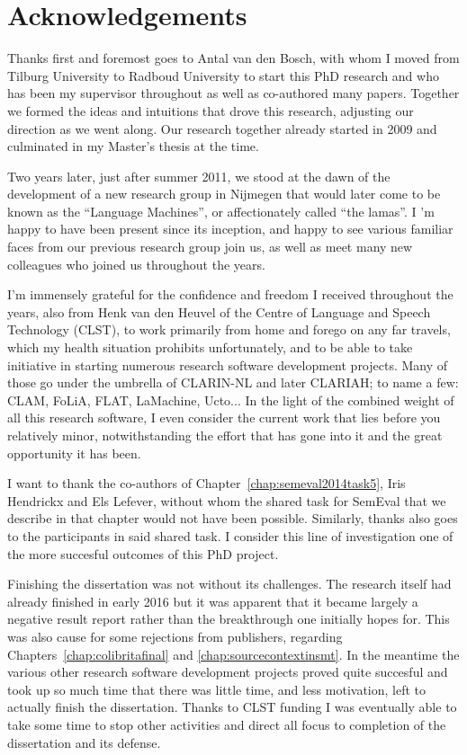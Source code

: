 \chapter*{Acknowledgements}

Thanks first and foremost goes to Antal van den Bosch, with whom I moved from
Tilburg University to Radboud University to start this PhD research and who has
been my supervisor throughout as well as co-authored many papers. Together we formed
the ideas and intuitions that drove this research, adjusting our direction as
we went along. Our research together already started in 2009
and culminated in my Master's thesis at the time.

Two years later, just after summer 2011, we stood at the dawn of the
development of a new research group in Nijmegen that would later come to be
known as the ``Language Machines'', or affectionately called ``the lamas''.  I
'm happy to have been present since its inception, and happy to see
various familiar faces from our previous research group join us, as well as
meet many new colleagues who joined us throughout the years.

I'm immensely grateful for the confidence and freedom I received throughout the
years, also from Henk van den Heuvel of the Centre of Language and Speech
Technology (CLST), to work primarily from home and forego on any far travels,
which my health situation prohibits unfortunately, and to be able to take
initiative in starting numerous research software development projects. Many of
those go under the umbrella of CLARIN-NL and later CLARIAH; to name a few:
CLAM, FoLiA, FLAT, LaMachine, Ucto... In the light of the combined weight of
all this research software, I even consider the current work that lies before
you relatively minor, notwithstanding the effort that has gone into it and the
great opportunity it has been.

I want to thank the co-authors of Chapter~\ref{chap:semeval2014task5}, Iris
Hendrickx and Els Lefever, without whom the shared task for SemEval that we
describe in that chapter would not have been possible. Similarly, thanks also
goes to the participants in said shared task. I consider this line of
investigation one of the more succesful outcomes of this PhD project.

Finishing the dissertation was not without its challenges. The research itself
had already finished in early 2016 but it was apparent that it became largely a
negative result report rather than the breakthrough one initially hopes for.
This was also cause for some rejections from publishers, regarding
Chapters~\ref{chap:colibritafinal} and \ref{chap:sourcecontextinsmt}. In the
meantime the various other research software development projects proved quite
succesful and took up so much time that there was little time, and less
motivation, left to actually finish the dissertation. Thanks to CLST funding I
was eventually able to take some time to stop other activities and direct
all focus to completion of the dissertation and its defense.

